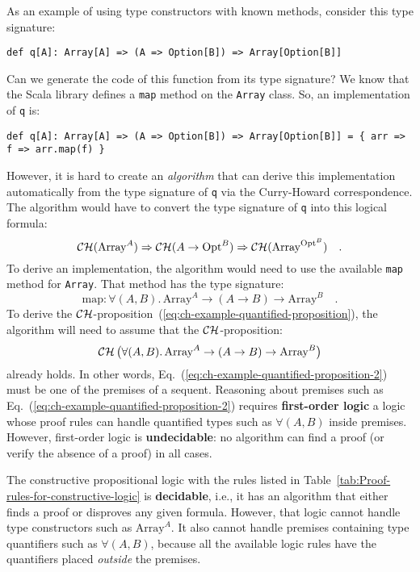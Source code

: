 As an example of using type constructors with known methods, consider
this type signature:
\begin{lstlisting}
def q[A]: Array[A] => (A => Option[B]) => Array[Option[B]]
\end{lstlisting}
Can we generate the code of this function from its type signature?
We know that the Scala library defines a \lstinline!map! method on
the \lstinline!Array! class. So, an implementation of \lstinline!q!
is:
\begin{lstlisting}
def q[A]: Array[A] => (A => Option[B]) => Array[Option[B]] = { arr => f => arr.map(f) }
\end{lstlisting}
However, it is hard to create an \emph{algorithm} that can derive
this implementation automatically from the type signature of \lstinline!q!
via the Curry-Howard correspondence. The algorithm would have to convert
the type signature of \lstinline!q! into this logical formula:
\begin{equation}
{\cal CH}(\text{Array}^{A})\Rightarrow{\cal CH}(A\rightarrow\text{Opt}^{B})\Rightarrow{\cal CH}(\text{Array}^{\text{Opt}^{B}})\quad.\label{eq:ch-example-quantified-proposition}
\end{equation}
To derive an implementation, the algorithm would need to use the available
\lstinline!map! method for \lstinline!Array!. That method has the
type signature:
\[
\text{map}:\forall(A,B).\,\text{Array}^{A}\rightarrow\left(A\rightarrow B\right)\rightarrow\text{Array}^{B}\quad.
\]
To derive the ${\cal CH}$-proposition~(\ref{eq:ch-example-quantified-proposition}),
the algorithm will need to assume that the ${\cal CH}$-proposition:
\begin{equation}
{\cal CH}\,\big(\forall(A,B).\,\text{Array}^{A}\rightarrow\left(A\rightarrow B\right)\rightarrow\text{Array}^{B}\big)\label{eq:ch-example-quantified-proposition-2}
\end{equation}
already holds. In other words, Eq.~(\ref{eq:ch-example-quantified-proposition-2})
must be one of the premises of a sequent. Reasoning about premises
such as Eq.~(\ref{eq:ch-example-quantified-proposition-2}) requires
\textbf{first-order logic} \textemdash{}
a logic whose proof rules can handle quantified types such as $\forall(A,B)$\emph{
}inside premises. However, first-order logic is \textbf{undecidable}:
no algorithm can find a proof (or verify the absence of a proof) in
all cases. 

The constructive propositional logic with the rules listed in Table~\ref{tab:Proof-rules-for-constructive-logic}
is \textbf{decidable}, i.e., it has an algorithm
that either finds a proof or disproves any given formula. However,
that logic cannot handle type constructors such as $\text{Array}^{A}$.
It also cannot handle premises containing type quantifiers such as
$\forall(A,B)$, because all the available logic rules have the quantifiers
placed \emph{outside} the premises. 

